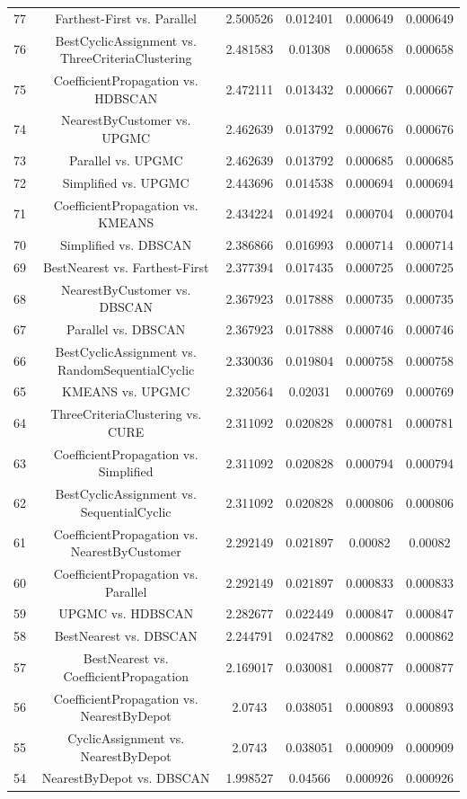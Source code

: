 \documentclass[a4paper,10pt]{article}
\begin{document}
\begin{landscape}
\begin{table}[!htp]
\begin{tabular}{cccccc}
77&Farthest-First vs. Parallel&2.500526&0.012401&0.000649&0.000649\\
76&BestCyclicAssignment vs. ThreeCriteriaClustering&2.481583&0.01308&0.000658&0.000658\\
75&CoefficientPropagation vs. HDBSCAN&2.472111&0.013432&0.000667&0.000667\\
74&NearestByCustomer vs. UPGMC&2.462639&0.013792&0.000676&0.000676\\
73&Parallel vs. UPGMC&2.462639&0.013792&0.000685&0.000685\\
72&Simplified vs. UPGMC&2.443696&0.014538&0.000694&0.000694\\
71&CoefficientPropagation vs. KMEANS&2.434224&0.014924&0.000704&0.000704\\
70&Simplified vs. DBSCAN&2.386866&0.016993&0.000714&0.000714\\
69&BestNearest vs. Farthest-First&2.377394&0.017435&0.000725&0.000725\\
68&NearestByCustomer vs. DBSCAN&2.367923&0.017888&0.000735&0.000735\\
67&Parallel vs. DBSCAN&2.367923&0.017888&0.000746&0.000746\\
66&BestCyclicAssignment vs. RandomSequentialCyclic&2.330036&0.019804&0.000758&0.000758\\
65&KMEANS vs. UPGMC&2.320564&0.02031&0.000769&0.000769\\
64&ThreeCriteriaClustering vs. CURE&2.311092&0.020828&0.000781&0.000781\\
63&CoefficientPropagation vs. Simplified&2.311092&0.020828&0.000794&0.000794\\
62&BestCyclicAssignment vs. SequentialCyclic&2.311092&0.020828&0.000806&0.000806\\
61&CoefficientPropagation vs. NearestByCustomer&2.292149&0.021897&0.00082&0.00082\\
60&CoefficientPropagation vs. Parallel&2.292149&0.021897&0.000833&0.000833\\
59&UPGMC vs. HDBSCAN&2.282677&0.022449&0.000847&0.000847\\
58&BestNearest vs. DBSCAN&2.244791&0.024782&0.000862&0.000862\\
57&BestNearest vs. CoefficientPropagation&2.169017&0.030081&0.000877&0.000877\\
56&CoefficientPropagation vs. NearestByDepot&2.0743&0.038051&0.000893&0.000893\\
55&CyclicAssignment vs. NearestByDepot&2.0743&0.038051&0.000909&0.000909\\
54&NearestByDepot vs. DBSCAN&1.998527&0.04566&0.000926&0.000926\\

\end{tabular}
\end{table}
\end{landscape}
\end{document}
